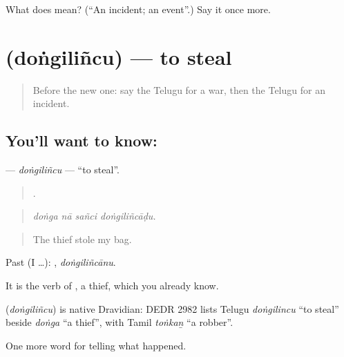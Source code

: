 \begin{tcolorbox}[breakable,colback=teal!4,colframe=teal!35!black,title={Before you move on}]
What does  mean? (\textquotedblleft{}An incident; an event\textquotedblright{}.) Say it once more.
\end{tcolorbox}
\section[\texorpdfstring{\te{దొంగిలించు} (doṅgiliñcu)}{దొంగిలించు (doṅgiliñcu)}]{ (doṅgiliñcu) — to steal}

\label{lesson:TE-C326-dongilincu}



\begin{quote}
Before the new one: say the Telugu for a war, then the Telugu for an incident.
\end{quote}

\subsection*{You'll want to know: }
\textbf{} — \emph{doṅgiliñcu} — \textquotedblleft{}to steal\textquotedblright{}.

\begin{quote}
   .
\end{quote}

\begin{quote}
\emph{doṅga nā sañci doṅgiliñcāḍu.}
\end{quote}

\begin{quote}
The thief stole my bag.
\end{quote}

Past (I …): , \emph{doṅgiliñcānu}.

It is the verb of , a thief, which you already know.

\begin{cousinweb}
\textbf{} (\emph{doṅgiliñcu}) is native Dravidian: DEDR 2982 lists Telugu \emph{doṅgilincu} \textquotedblleft{}to steal\textquotedblright{} beside \emph{doṅga} \textquotedblleft{}a thief\textquotedblright{}, with Tamil \emph{toṅkaṉ} \textquotedblleft{}a robber\textquotedblright{}.
\end{cousinweb}

\begin{grammarlens}[title={What you've built}]
One more word for telling what happened.
\end{grammarlens}

